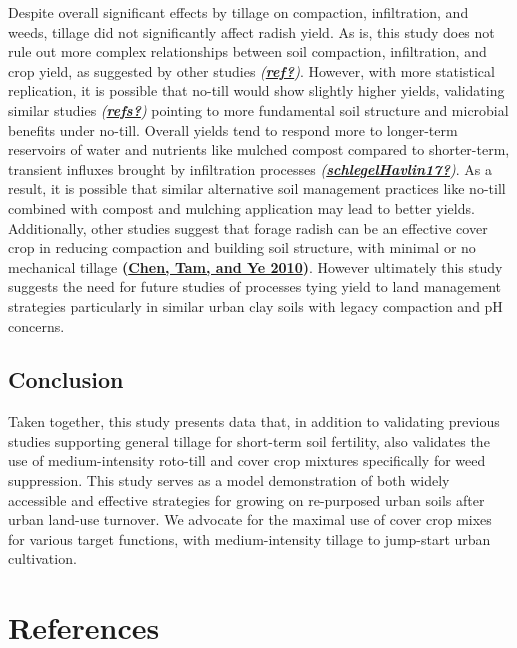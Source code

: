 \documentclass[
]{article}
\begin{document}
Despite overall significant effects by tillage on compaction, infiltration, and weeds, tillage did not significantly affect radish yield.
As is, this study does not rule out more complex relationships between soil compaction, infiltration, and crop yield, as suggested by other studies \emph{(\protect\hyperlink{ref-ref}{\textbf{ref?}})}.
However, with more statistical replication, it is possible that no-till would show slightly higher yields, validating similar studies \emph{(\protect\hyperlink{ref-refs}{\textbf{refs?}})} pointing to more fundamental soil structure and microbial benefits under no-till.
Overall yields tend to respond more to longer-term reservoirs of water and nutrients like mulched compost compared to shorter-term, transient influxes brought by infiltration processes \emph{(\protect\hyperlink{ref-schlegelHavlin17}{\textbf{schlegelHavlin17?}})}.
As a result, it is possible that similar alternative soil management practices like no-till combined with compost and mulching application may lead to better yields.
Additionally, other studies suggest that forage radish can be an effective cover crop in reducing compaction and building soil structure, with minimal or no mechanical tillage \textbf{(\protect\hyperlink{ref-chen10}{Chen, Tam, and Ye 2010})}.
However ultimately this study suggests the need for future studies of processes tying yield to land management strategies particularly in similar urban clay soils with legacy compaction and pH concerns.

\hypertarget{conclusion}{%
\subsection{Conclusion}\label{conclusion}}

Taken together, this study presents data that, in addition to validating previous studies supporting general tillage for short-term soil fertility, also validates the use of medium-intensity roto-till and cover crop mixtures specifically for weed suppression.
This study serves as a model demonstration of both widely accessible and effective strategies for growing on re-purposed urban soils after urban land-use turnover.
We advocate for the maximal use of cover crop mixes for various target functions, with medium-intensity tillage to jump-start urban cultivation.

\newpage

\hypertarget{references}{%
\section*{References}\label{references}}
\end{document}
